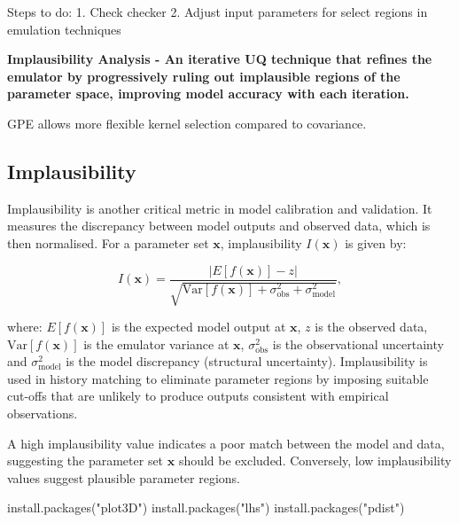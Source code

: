 Steps to do:
1. Check checker
2. Adjust input parameters for select regions in emulation techniques

\textbf{ Implausibility Analysis - An iterative UQ technique that refines the emulator by progressively ruling out implausible regions of the parameter space, improving model accuracy with each iteration.\cite{iskauskas2019hmer} }

GPE allows more flexible kernel selection compared to covariance.\cite{ohagan2006bayesian}

\subsection{Implausibility}
Implausibility is another critical metric in model calibration and validation. It measures the discrepancy between model outputs and observed data, which is then normalised. For a parameter set \( \mathbf{x} \), implausibility \( I(\mathbf{x}) \) is given by:

\[
I(\mathbf{x}) = \frac{|E[f(\mathbf{x})] - z|}{\sqrt{\text{Var}[f(\mathbf{x})] + \sigma^2_{\text{obs}} + \sigma^2_{\text{model}}}},
\]

\noindent where: \( E[f(\mathbf{x})] \) is the expected model output at \( \mathbf{x} \),
\( z \) is the observed data, \( \text{Var}[f(\mathbf{x})] \) is the emulator variance at \( \mathbf{x} \), \( \sigma^2_{\text{obs}} \) is the observational uncertainty and \( \sigma^2_{\text{model}} \) is the model discrepancy (structural uncertainty). Implausibility is used in history matching to eliminate parameter regions by imposing suitable cut-offs that are unlikely to produce outputs consistent with empirical observations. \cite{andrianakis2015bayesian, vernon2010galaxy}

A high implausibility value indicates a poor match between the model and data, suggesting the parameter set \( \mathbf{x} \) should be excluded. Conversely, low implausibility values suggest plausible parameter regions.

install.packages("plot3D")
install.packages("lhs")
install.packages("pdist")

